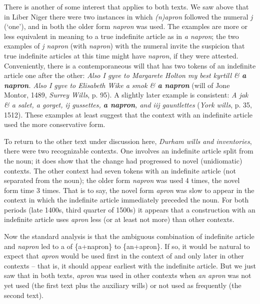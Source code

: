 \documentclass[output=paper,
modfonts
]{LSP/langsci}
\begin{document}
There is another  of some interest that applies to both texts.
We saw above that in Liber Niger there were two instances in which
\emph{(n)apron} followed the numeral \emph{j} (`one'), and in both the
older form \emph{napron} was used. The examples are more or less
equivalent in meaning to a true indefinite article as in \emph{a
napron}; the two examples of \emph{j napron} (with \emph{napron}) with
the numeral invite the suspicion that true indefinite articles at this
time might have \emph{napron}, if they were attested. Conveniently,
there is a contemporaneous will that has two tokens of an indefinite
article one after the other: \emph{Also I gyve to Margarete Holton my
best kyrtill \& \textbf{a napron}. Also I gyve to Elisabeth Wike a smok
\& \textbf{a napron}} (will of Jone Montor, 1489, \emph{Surrey Wills},
p. 95). A slightly later example is consistent: \emph{A jak \& a salet,
a gorget, ij gussettes, \textbf{a napron}, and iij gauntlettes}
(\emph{York wills}, p. 35, 1512). These examples at least suggest that
the context with an indefinite article used the more conservative form.

To return to the other text under discussion here, \textit{Durham wills and
inventories}, there were two recognizable contexts. One involves an
indefinite article split from the noun; it does show that the change had
progressed to novel (unidiomatic) contexts. The other context had seven
tokens with an indefinite article (not separated from the noun); the
older form \emph{napron} was used 4 times, the novel form time 3 times.
That is to say, the novel form \emph{apron} was slow to appear in the
context in which the indefinite article immediately preceded the noun.
For both periods (late 1400s, third quarter of 1500s) it appears that a
construction with an indefinite article uses \emph{apron} less (or at
least not more) than other contexts.

\largerpage
Now the standard analysis is that the ambiguous combination of
indefinite article and \emph{napron} led to a  of \{a+napron\}
to \{an+apron\}. If so, it would be natural to expect that \emph{apron}
would be used first in the context of  and only later in other
contexts -- that is, it should appear earliest with the indefinite
article. But we just saw that in both texts, \emph{apron} was used in
other contexts when \emph{an apron} was not yet used (the first text
plus the auxiliary wills) or not used as frequently (the second text).
\end{document}
